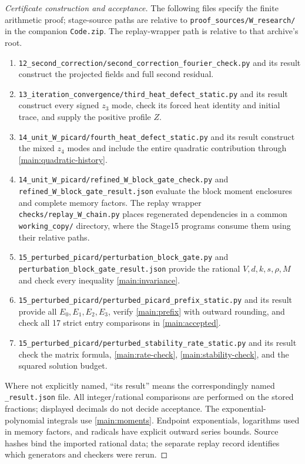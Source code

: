 \begin{proof}[Certificate construction and acceptance]
The following files specify the finite arithmetic proof; stage-source paths
are relative to \texttt{proof\_sources/W\_research/} in the companion
\texttt{Code.zip}. The replay-wrapper path is relative to that archive's root.
\begin{enumerate}
\item \nolinkurl{12_second_correction/second_correction_fourier_check.py}
and its result construct the projected fields and full second residual.
\item \nolinkurl{13_iteration_convergence/third_heat_defect_static.py}
and its result construct every signed $z_3$ mode, check its forced heat
identity and initial trace, and supply the positive profile $Z$.
\item \nolinkurl{14_unit_W_picard/fourth_heat_defect_static.py}
and its result construct the mixed $z_4$ modes and include the entire
quadratic contribution through \eqref{main:quadratic-history}.
\item \nolinkurl{14_unit_W_picard/refined_W_block_gate_check.py}
and \nolinkurl{refined_W_block_gate_result.json} evaluate the block moment enclosures and complete memory
factors. The replay wrapper \nolinkurl{checks/replay_W_chain.py} places
regenerated dependencies in a common \nolinkurl{working_copy/} directory,
where the Stage15 programs consume them using their relative paths.
\item \nolinkurl{15_perturbed_picard/perturbation_block_gate.py}
and \nolinkurl{perturbation_block_gate_result.json} provide the rational
$V,d,k,s,\rho,M$ and check every inequality \eqref{main:invariance}.
\item \nolinkurl{15_perturbed_picard/perturbed_picard_prefix_static.py}
and its result provide all $E_0,E_1,E_2,E_3$, verify
\eqref{main:prefix} with outward rounding, and check all 17 strict entry
comparisons in \eqref{main:accepted}.
\item \nolinkurl{15_perturbed_picard/perturbed_stability_rate_static.py}
and its result check the matrix formula, \eqref{main:rate-check},
\eqref{main:stability-check}, and the squared solution budget.
\end{enumerate}
Where not explicitly named, ``its result'' means the correspondingly named
\nolinkurl{_result.json} file. All integer/rational comparisons are performed
on the stored fractions; displayed decimals do not decide acceptance.
The exponential-polynomial integrals use \eqref{main:moments}. Endpoint
exponentials, logarithms used in memory factors, and radicals have explicit
outward series bounds. Source hashes bind the imported rational data; the
separate replay record identifies which generators and checkers were rerun.


\end{proof}
